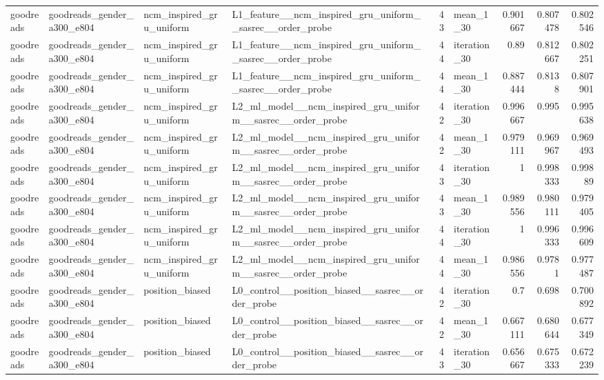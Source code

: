 \begin{table}[htbp!]
\begin{tabular}{llllrlrrr}
goodreads & goodreads\_gender\_a300\_e804 & ncm\_inspired\_gru\_uniform & L1\_feature\_\_ncm\_inspired\_gru\_uniform\_\_sasrec\_\_order\_probe & 43 & mean\_1\_30 & 0.901667 & 0.807478 & 0.802546 \\
goodreads & goodreads\_gender\_a300\_e804 & ncm\_inspired\_gru\_uniform & L1\_feature\_\_ncm\_inspired\_gru\_uniform\_\_sasrec\_\_order\_probe & 44 & iteration\_30 & 0.89 & 0.812667 & 0.802251 \\
goodreads & goodreads\_gender\_a300\_e804 & ncm\_inspired\_gru\_uniform & L1\_feature\_\_ncm\_inspired\_gru\_uniform\_\_sasrec\_\_order\_probe & 44 & mean\_1\_30 & 0.887444 & 0.8138 & 0.807901 \\
goodreads & goodreads\_gender\_a300\_e804 & ncm\_inspired\_gru\_uniform & L2\_ml\_model\_\_ncm\_inspired\_gru\_uniform\_\_sasrec\_\_order\_probe & 42 & iteration\_30 & 0.996667 & 0.995 & 0.995638 \\
goodreads & goodreads\_gender\_a300\_e804 & ncm\_inspired\_gru\_uniform & L2\_ml\_model\_\_ncm\_inspired\_gru\_uniform\_\_sasrec\_\_order\_probe & 42 & mean\_1\_30 & 0.979111 & 0.969967 & 0.969493 \\
goodreads & goodreads\_gender\_a300\_e804 & ncm\_inspired\_gru\_uniform & L2\_ml\_model\_\_ncm\_inspired\_gru\_uniform\_\_sasrec\_\_order\_probe & 43 & iteration\_30 & 1 & 0.998333 & 0.99889 \\
goodreads & goodreads\_gender\_a300\_e804 & ncm\_inspired\_gru\_uniform & L2\_ml\_model\_\_ncm\_inspired\_gru\_uniform\_\_sasrec\_\_order\_probe & 43 & mean\_1\_30 & 0.989556 & 0.980111 & 0.979405 \\
goodreads & goodreads\_gender\_a300\_e804 & ncm\_inspired\_gru\_uniform & L2\_ml\_model\_\_ncm\_inspired\_gru\_uniform\_\_sasrec\_\_order\_probe & 44 & iteration\_30 & 1 & 0.996333 & 0.996609 \\
goodreads & goodreads\_gender\_a300\_e804 & ncm\_inspired\_gru\_uniform & L2\_ml\_model\_\_ncm\_inspired\_gru\_uniform\_\_sasrec\_\_order\_probe & 44 & mean\_1\_30 & 0.986556 & 0.9781 & 0.977487 \\
goodreads & goodreads\_gender\_a300\_e804 & position\_biased & L0\_control\_\_position\_biased\_\_sasrec\_\_order\_probe & 42 & iteration\_30 & 0.7 & 0.698 & 0.700892 \\
goodreads & goodreads\_gender\_a300\_e804 & position\_biased & L0\_control\_\_position\_biased\_\_sasrec\_\_order\_probe & 42 & mean\_1\_30 & 0.667111 & 0.680644 & 0.677349 \\
goodreads & goodreads\_gender\_a300\_e804 & position\_biased & L0\_control\_\_position\_biased\_\_sasrec\_\_order\_probe & 43 & iteration\_30 & 0.656667 & 0.675333 & 0.672239 \\

\end{tabular}
\end{table}
